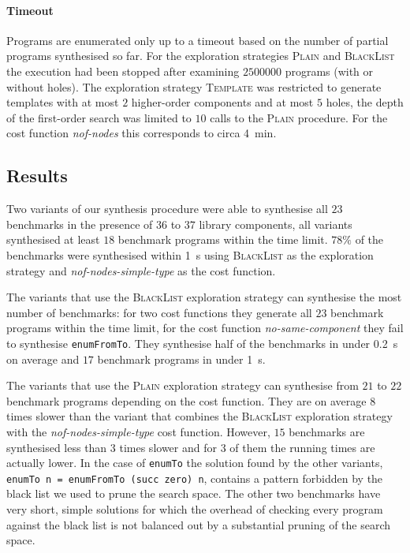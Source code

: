 \paragraph{Timeout} Programs are enumerated only up to a timeout based on the number of partial programs synthesised so far. For the exploration strategies \textsc{Plain} and \textsc{BlackList} the execution had been stopped after examining $2500000$ programs (with or without holes). The exploration strategy \textsc{Template} was restricted to generate templates with at most $2$ higher-order components and at most $5$ holes, the depth of the first-order search was limited to $10$ calls to the \textsc{Plain} procedure. For the cost function \textit{nof-nodes} this corresponds to circa \SI{4}{min}.

\subsection{Results}\label{Table summary}
Two variants of our synthesis procedure were able to synthesise all $23$ benchmarks in the presence of $36$ to $37$ library components, all variants synthesised at least $18$ benchmark programs within the time limit. $78\%$ of the benchmarks were synthesised within \SI{1}{s} using \textsc{BlackList} as the exploration strategy and \textit{nof-nodes-simple-type} as the cost function.

The variants that use the \textsc{BlackList} exploration strategy can synthesise the most number of benchmarks: for two cost functions they generate all $23$ benchmark programs within the time limit, for the cost function \textit{no-same-component} they fail to synthesise \lstinline?enumFromTo?. They synthesise half of the benchmarks in under \SI{0.2}{s} on average and $17$ benchmark programs in under \SI{1}{s}.

The variants that use the \textsc{Plain} exploration strategy can synthesise from $21$ to $22$ benchmark programs depending on the cost function. They are on average $8$ times slower than the variant that combines the \textsc{BlackList} exploration strategy with the \textit{nof-nodes-simple-type} cost function. However, $15$ benchmarks are synthesised less than $3$ times slower and for $3$ of them the running times are actually lower. In the case of \lstinline?enumTo? the solution found by the other variants, \lstinline?enumTo n = enumFromTo (succ zero) n?, contains a pattern forbidden by the black list we used to prune the search space. The other two benchmarks have very short, simple solutions for which the overhead of checking every program against the black list is not balanced out by a substantial pruning of the search space.

